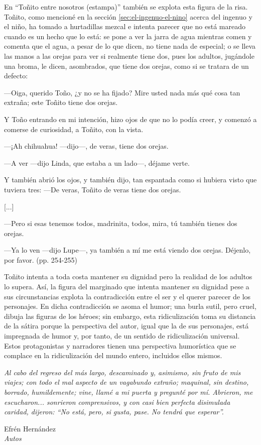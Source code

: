 \documentclass[14pt,twoside,final]{extbook} %
\begin{document}
En ``Toñito entre nosotros (estampa)'' también se explota esta figura de la risa. Toñito, como mencioné en la sección \ref{sec:el-ingenuo-el-nino} acerca del ingenuo y el niño, ha tomado a hurtadillas mezcal e intenta parecer que no está mareado cuando es un hecho que lo está: se pone a ver la jarra de agua mientras comen y comenta que el agua, a pesar de lo que dicen, no tiene nada de especial; o se lleva las manos a las orejas para ver si realmente tiene dos, pues los adultos, jugándole una broma, le dicen, asombrados, que tiene dos orejas, como si se tratara de un defecto:
\begin{quoting}
---Oiga, querido Toño, ¿y no se ha fijado? Mire usted nada más qué cosa tan extraña; este Toñito tiene dos orejas.

Y Toño entrando en mi intención, hizo ojos de que no lo podía creer, y comenzó a comerse de curiosidad, a Toñito, con la vista.

---¡Ah chihuahua! ---dijo---, de veras, tiene dos orejas.

---A ver ---dijo Linda, que estaba a un lado---, déjame verte.

Y también abrió los ojos, y también dijo, tan espantada como si hubiera visto que tuviera tres: ---De veras, Toñito de veras tiene dos orejas.

\centerline{[...]}

---Pero si esas tenemos todos, madrinita, todos, mira, tú también tienes dos orejas.

---Ya lo ven ---dijo Lupe---, ya también a mí me está viendo dos orejas. Déjenlo, por favor. (pp. 254-255)
\end{quoting}
Toñito intenta a toda costa mantener su dignidad pero la realidad de los adultos lo supera. Así, la figura del marginado que intenta mantener su dignidad pese a sus circunstancias explota la contradicción entre el ser y el querer parecer de los personajes. En dicha contradicción se asoma el
humor; una burla sutil, pero cruel, dibuja las figuras de los héroes; sin embargo, esta ridiculización toma su distancia de la sátira porque la perspectiva del autor, igual que la de sus personajes, está impregnada de humor y, por tanto, de un sentido de ridiculización universal. Estos protagonistas y narradores tienen una perspectiva humorística que se complace en la ridiculización del mundo entero, incluidos ellos mismos.
\cleardoublepage
\newpage
\pagestyle{empty}
\vspace*{42pt}
\begin{flushright}
\begin{minipage}{7.5cm} %
\emph{Al cabo del regreso del más largo, descaminado y, asimismo, sin fruto de mis viajes; con todo el mal aspecto de un vagabundo extraño; maquinal, sin destino, borrado, humildemente; vine, llamé a mi puerta y pregunté por mí. Abrieron, me escucharon... sonrieron comprensivos, y con casi bien perfecta disimulada caridad, dijeron: ``No está, pero, si gusta, pase. No tendrá que esperar''.}
\begin{flushright}
Efrén Hernández \\ \emph{Autos}
\end{flushright}
\end{minipage}
\end{flushright}
\end{document}
